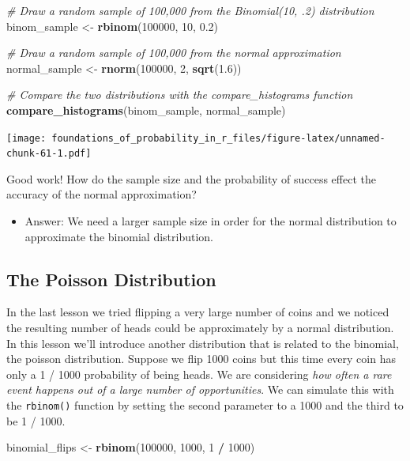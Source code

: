 \documentclass[]{article}
\newenvironment{Shaded}{\begin{snugshade}}{\end{snugshade}}
\newcommand{\CommentTok}[1]{\textcolor[rgb]{0.56,0.35,0.01}{\textit{#1}}}
\newcommand{\DecValTok}[1]{\textcolor[rgb]{0.00,0.00,0.81}{#1}}
\newcommand{\FloatTok}[1]{\textcolor[rgb]{0.00,0.00,0.81}{#1}}
\newcommand{\KeywordTok}[1]{\textcolor[rgb]{0.13,0.29,0.53}{\textbf{#1}}}
\newcommand{\NormalTok}[1]{#1}
\newcommand{\OperatorTok}[1]{\textcolor[rgb]{0.81,0.36,0.00}{\textbf{#1}}}
\newcommand{\StringTok}[1]{\textcolor[rgb]{0.31,0.60,0.02}{#1}}
\providecommand{\tightlist}{%
  \setlength{\itemsep}{0pt}\setlength{\parskip}{0pt}}
\begin{document}
\begin{Shaded}
\begin{Highlighting}[]
\CommentTok{# Draw a random sample of 100,000 from the Binomial(10, .2) distribution}
\NormalTok{binom_sample <-}\StringTok{ }\KeywordTok{rbinom}\NormalTok{(}\DecValTok{100000}\NormalTok{, }\DecValTok{10}\NormalTok{, }\FloatTok{0.2}\NormalTok{)}

\CommentTok{# Draw a random sample of 100,000 from the normal approximation}
\NormalTok{normal_sample <-}\StringTok{ }\KeywordTok{rnorm}\NormalTok{(}\DecValTok{100000}\NormalTok{, }\DecValTok{2}\NormalTok{, }\KeywordTok{sqrt}\NormalTok{(}\FloatTok{1.6}\NormalTok{))}

\CommentTok{# Compare the two distributions with the compare_histograms function}
\KeywordTok{compare_histograms}\NormalTok{(binom_sample, normal_sample)}
\end{Highlighting}
\end{Shaded}

\texttt{[image: foundations\_of\_probability\_in\_r\_files/figure-latex/unnamed-chunk-61-1.pdf]}

Good work! How do the sample size and the probability of success effect
the accuracy of the normal approximation?

\begin{itemize}
\tightlist
\item
  Answer: We need a larger sample size in order for the normal
  distribution to approximate the binomial distribution.
\end{itemize}

\hypertarget{the-poisson-distribution}{%
\subsection{The Poisson Distribution}\label{the-poisson-distribution}}

In the last lesson we tried flipping a very large number of coins and we
noticed the resulting number of heads could be approximately by a normal
distribution. In this lesson we'll introduce another distribution that
is related to the binomial, the poisson distribution. Suppose we flip
1000 coins but this time every coin has only a 1 / 1000 probability of
being heads. We are considering \emph{how often a rare event happens out
of a large number of opportunities}. We can simulate this with the
\texttt{rbinom()} function by setting the second parameter to a 1000 and
the third to be 1 / 1000.

\begin{Shaded}
\begin{Highlighting}[]
\NormalTok{binomial_flips <-}\StringTok{ }\KeywordTok{rbinom}\NormalTok{(}\DecValTok{100000}\NormalTok{, }\DecValTok{1000}\NormalTok{, }\DecValTok{1} \OperatorTok{/}\StringTok{ }\DecValTok{1000}\NormalTok{)}
\end{Highlighting}
\end{Shaded}
\end{document}
